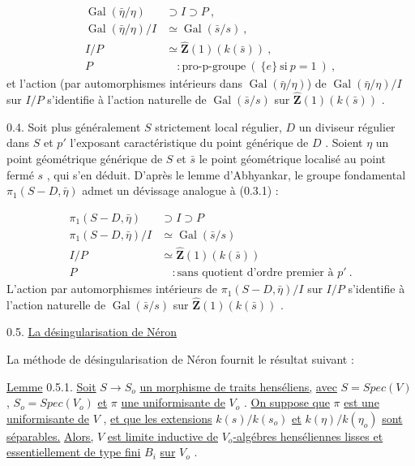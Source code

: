 \begin{equation}\tag{0.3.1}
\begin{aligned}
\operatorname{Gal}(\bar\eta/\eta) &\supset I \supset P \ , \\
\operatorname{Gal}(\bar\eta/\eta)/I &\simeq \operatorname{Gal}(\bar s/s) \ , \\
I/P &\simeq \hat{\mathbf{Z}}(1)(k(\bar s)) \ , \\
P &\quad : \text{pro-p-groupe} \ (\ \{e\} \ \text{si} \ p = 1 \ ) \ ,
\end{aligned}
\end{equation}
et l'action (par automorphismes intérieurs dans  $\operatorname{Gal}(\bar\eta/\eta)$) de  $\operatorname{Gal}(\bar\eta/\eta)/I$  sur  $I/P$  s'identifie à l'action naturelle de  $\operatorname{Gal}(\bar s/s)$  sur  $\hat{\mathbf{Z}}(1)(k(\bar s))$  .

0.4.  Soit plus généralement  $S$  strictement local régulier, $D$  un diviseur régulier dans  $S$  et  $p'$  l'exposant caractéristique du point générique de  $D$ . Soient  $\eta$  un point géométrique générique de  $S$  et  $\bar s$  le point géométrique localisé au point fermé  $s$ , qui s'en déduit. D'après le lemme d'Abhyankar, le groupe fondamental  $\pi_1(S\!-\!D,\bar\eta)$  admet un dévissage analogue à (0.3.1) :

\begin{equation}\tag{0.4.1}
\begin{aligned}
\pi_1(S\!-\!D,\bar\eta) &\supset I \supset P \\
\pi_1(S\!-\!D,\bar\eta)/I &\simeq \operatorname{Gal}(\bar s/s) \\
I/P &\simeq \hat{\mathbf{Z}}(1)(k(\bar s)) \\
P &\quad : \text{sans quotient d'ordre premier à } p' \ .
\end{aligned}
\end{equation}
L'action par automorphismes intérieurs de  $\pi_1(S\!-\!D,\bar\eta)/I$  sur  $I/P$  s'identifie à l'action naturelle de  $\operatorname{Gal}(\bar s/s)$  sur  $\hat{\mathbf{Z}}(1)(k(\bar s))$  .


0.5.  \underline{La désingularisation de Néron}

La méthode de désingularisation de Néron fournit le résultat suivant :

\underline{Lemme} 0.5.1.  \underline{Soit}  $S \longrightarrow S_o$  \underline{un morphisme de traits henséliens,}  \underline{avec}  $S = Spec(V)$ ,  $S_o = Spec(V_o)$  \underline{et}  $\pi$  \underline{une uniformisante de}  $V_o$ .  \underline{On suppose que}  $\pi$  \underline{est une uniformisante de}  $V$ ,  \underline{et que les extensions}  $k(s)/k(s_o)$  \underline{et}  $k(\eta)/k(\eta_o)$  \underline{sont séparables.}  \underline{Alors,}  $V$  \underline{est limite inductive de}  $V_o$\underline{-algébres henséliennes lisses et essentiellement de type fini}  $B_i$  \underline{sur}  $V_o$ .



